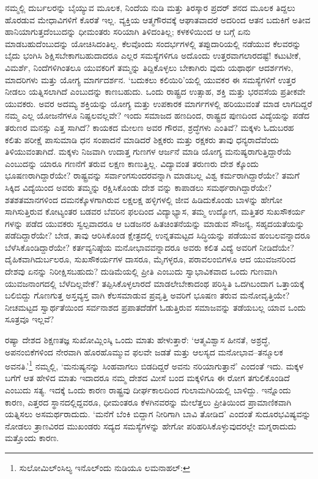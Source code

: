 ನಮ್ಮಲ್ಲಿ ದುರ್ಬಲರನ್ನು ಬೈಯ್ಯುವ ಮೂಲಕ, ನಿಂದೆಯ ನುಡಿ ಮತ್ತು ತಿರಸ್ಕಾರ ಪ್ರದರ್ ಶನದ ಮೂಲಕ ತಿದ್ದಲು ಹೊರಡುವ ಮೇಧಾವಿಗಳಿಗೆ ಕೊರತೆ ಇಲ್ಲ. ವ್ಯಕ್ತಿಯ ಆತ್ಮಗೌರವಕ್ಕೆ ಆಘಾತವಾದರೆ ಅದರಿಂದ ಆತನ ಬದುಕಿಗೆ ಅತೀವ ಹಾನಿಯಾಗುತ್ತದೆಂಬುದನ್ನು ಧೀಮಂತರು ಸರಿಯಾಗಿ ತಿಳಿದಂತಿಲ್ಲ; ಕಳಕಳಿಯಿಂದ ಆ ಬಗ್ಗೆ ಏನು ಮಾಡಬಹುದೆಂಬುದನ್ನು ಯೋಚಿಸಿದಂತಿಲ್ಲ. ಕೆಲವೊಂದು ಸಂದರ್ಭಗಳಲ್ಲಿ ತಪ್ಪುದಾರಿಯಲ್ಲಿ ನಡೆಯುವ ಕೆಲವರನ್ನು ಬೈದು ಭಂಗಿಸಿ ಶಿಕ್ಷಿಸಬೇಕಾಗಬಹುದಾದರೂ ಎಲ್ಲರ ಸಮಸ್ಯೆಗಳಿಗೂ ಅದೊಂದು ಉತ್ತರವಾಗಲಾರದಷ್ಟೆ! ಕಟುಟೀಕೆ, ವಿಮರ್ಶೆ, ನಿಂದೆಗಳಿಗಿಂತಲೂ ಯುವಕರಿಗೆ ತಮ್ಮನ್ನು ತಿದ್ದಿಕೊಳ್ಳಲು ಬೇಕಾಗಿರು ವುದು ಯಥಾರ್ಥ ಆದರ್ಶಗಳು, ಮಾದರಿಗಳು ಮತ್ತು ಯೋಗ್ಯ ಮಾರ್ಗದರ್ಶನ. ‘ಬದುಕಲು ಕಲಿಯಿರಿ’ಯಲ್ಲಿ ಯುವಕರ ಈ ಸಮಸ್ಯೆಗಳಿಗೆ ಉತ್ತರ ನೀಡಲು ಯತ್ನಿಸಲಾಗಿದೆ ಎಂಬುದನ್ನು ಕಾಣಬಹುದು. ಒಂದು ರಾಷ್ಟ್ರದ ಉತ್ಸಾಹ, ಶಕ್ತಿ ಮತ್ತು ಭರವಸೆಯ ಪ್ರತೀಕವೇ ಯುವಕರು. ಅವರ ಅದಮ್ಯ ಶಕ್ತಿಯನ್ನು ಯೋಗ್ಯ ಮತ್ತು ಉಪಕಾರಕ ಮಾರ್ಗಗಳಲ್ಲಿ ಹರಿಯುವಂತೆ ಮಾಡ ಲಾಗದಿದ್ದರೆ ನಮ್ಮ ಎಲ್ಲ ಯೋಜನೆಗಳೂ ನಿಷ್ಫಲವಲ್ಲವೇ? ಇಂದು ಸಮಾಜದ ಹಣದಿಂದ, ರಾಷ್ಟ್ರದ ಪುಣದಿಂದ ವಿದ್ಯೆಯನ್ನು ಪಡೆದ ತರುಣರ ಮನಸ್ಸು ಎತ್ತ ಸಾಗಿದೆ? ಕಾಯಕದ ಮೇಲಣ ಅವರ ಗೌರವ, ಶ್ರದ್ಧೆಗಳು ಎಂತಿವೆ? ಮಕ್ಕಳು ಓದುಬರಹ ಕಲಿತು ಪರೀಕ್ಷೆ ಪಾಸುಮಾಡಿ ಧನ ಸಂಪಾದನೆ ಮಾಡಿದರೆ ಶಿಕ್ಷಕರು ಮತ್ತು ರಕ್ಷಕರು ತಾವು ಧನ್ಯರಾದೆವೆಂದು ತಿಳಿಯುವಂತಾಗಿದೆ. ಮಕ್ಕಳು ನಿಜವಾಗಿ ಉದಾತ್ತ ಗುಣಗಳ ಆರ್ಜನೆ ಮಾಡಿ ಯೋಗ್ಯ ಮನುಷ್ಯರಾಗುತ್ತಿದ್ದಾರೆಯೆ ಎಂಬುದನ್ನು ಯಾರೂ ಗಣನೆಗೆ ತರುವ ಲಕ್ಷಣ ಕಾಣುತ್ತಿಲ್ಲ. ವಿದ್ಯಾವಂತ ತರುಣರು ದೇಶ ಕ್ಕೊಂದು ಭೂಷಣರಾಗಿದ್ದಾರೆಯೇ? ರಾಷ್ಟ್ರವನ್ನು ಸರ್ವಾಂಗಸುಂದರವನ್ನಾಗಿ ಮಾಡಬಲ್ಲ ವಿಶ್ವ ಕರ್ಮರಾಗಿದ್ದಾರೆಯೇ? ತಮಗೆ ಸಿಕ್ಕಿದ ವಿದ್ಯೆಯಿಂದ ಅವರು ತಮ್ಮನ್ನು ರಕ್ಷಿಸಿಕೊಂಡು ದೇಶ ವನ್ನು ಕಾಪಾಡಲು ಸಮರ್ಥರಾಗಿದ್ದಾರೆಯೇ? ಶತಶತಮಾನಗಳಿಂದ ದಮನಕ್ಕೊಳಗಾಗಿರುವ ಲಕ್ಷಲಕ್ಷ ಹಳ್ಳಿಗಳಲ್ಲಿ ಜೀವ ಹಿಡಿದುಕೊಂಡು ಬಾಳನ್ನು ಹೇಗೋ ಸಾಗಿಸುತ್ತಿರುವ ಕೋಟ್ಯಂತರ ಬಡವರ ಬೆವರಿನ ಫಲದಿಂದ ವಿದ್ಯಾಭ್ಯಾಸ, ತಮ್ಮ ಉದ್ಯೋಗ, ಮತ್ತಿತರ ಸುಖಸೌಕರ್ಯ ಗಳನ್ನು ಪಡೆದ ಯುವಕರು ಸ್ವಲ್ಪವಾದರೂ ಆ ಬಡಜನರ ಹಿತಚಿಂತನೆಯನ್ನು ಮಾಡುವ ಸೌಜನ್ಯ, ಸಹೃದಯತೆಯನ್ನು ಪಡೆದಿದ್ದಾರೆಯೇ? ಬೇಡ, ತಾವು ಆರಿಸಿಕೊಂಡ ಕ್ಷೇತ್ರದಲ್ಲಿ ಉನ್ನತಮಟ್ಟದ ಸಿದ್ಧಿಯನ್ನು ಪಡೆಯುವ ಹಂಬಲವನ್ನಾದರೂ ಬೆಳೆಸಿಕೊಂಡಿದ್ದಾರೆಯೇ? ಕರ್ತವ್ಯನಿಷ್ಠೆಯ ಮನೋಭಾವವನ್ನಾದರೂ ಅವರು ಕಲಿತ ವಿದ್ಯೆ ಅವರಿಗೆ ನೀಡಿದೆಯೇ? ದೈಹಿಕವಾಗಿ\break ದುರ್ಬಲರೂ, ಸುಖಸೌಕರ್ಯಗಳ ದಾಸರೂ, ಮೈಗಳ್ಳರೂ, ಪರಾವಲಂಬಿಗಳೂ ಆದ ಯುವಜನರಿಂದ ದೇಶವು ಏನನ್ನು ನಿರೀಕ್ಷಿಸಬಹುದು? ದುಡಿಮೆಯಲ್ಲಿ ಪ್ರೀತಿ ಎಂಬುದು ಸ್ವಾಭಾವಿಕವಾದ ಒಂದು ಗುಣವಾಗಿ ಯುವಜನಾಂಗದಲ್ಲಿ ಬೆಳೆದಿಲ್ಲವೇಕೆ? ತಪ್ಪಿಸಿಕೊಳ್ಳಲಾರದೆ ಮಾಡಲೇಬೇಕಾ\-ದಂಥ ಪರಿಸ್ಥಿತಿ ಒದಗಿಬಂದಾಗ ಒತ್ತಾಯಕ್ಕೆ ಬಲಿಬಿದ್ದು ಗೊಣಗುತ್ತ ಅಸ್ತವ್ಯಸ್ತ ವಾಗಿ ಕೆಲಸಮಾಡುವ ಪ್ರವೃತ್ತಿ ಅವರಿಗೆ ಭೂಷಣ ತರುವ ಮನೋವೃತ್ತಿಯೇ? ನೀಚಮಟ್ಟದ ಸ್ವಾರ್ಥತೆಯಿಂದ ಸರ್ವನಾಶದ ಪ್ರಪಾತದೆಡೆಗೆ ಓಡುತ್ತಿರುವ ಸಮಾಜವನ್ನು ತಡೆಯಬಲ್ಲ ಯಾವ ಒಂದು ಸೂತ್ರವೂ ಇಲ್ಲವೆ?

ರಷ್ಯಾ ದೇಶದ ಶಿಕ್ಷಣತಜ್ಞ ಸುಖೋಮ್ಲಿಂಸ್ಕಿ ಒಂದು ಮಾತು ಹೇಳುತ್ತಾರೆ: ‘ಆತ್ಮವಿಶ್ವಾಸ ಹೀನತೆ, ಅಶ್ರದ್ಧೆ, ಅಪನಂಬಿಕೆಗಳಿಂದ ನೇರವಾಗಿ ಹೊರಹೊಮ್ಮುವ ಫಲವೇ ಜಡತೆ ಮತ್ತು ಆಲಸ್ಯದ ಮನೋಭಾವ–ತನ್ಮೂಲಕ ಅವನತಿ.’\footnote{ ಸುಲೋಮಿಲ್ಂಸಿಲ್ಯ ಇನೊಲ್ಂದು ನುಡಿಯೂ ಲಮನಾಹಲ್:

} ನಮ್ಮಲ್ಲಿ, ‘ಮನುಷ್ಯನನ್ನು ಸಿಂಹವಾಗಲು ಬಿಡದಿದ್ದರೆ ಅವನು ನರಿಯಾಗುತ್ತಾನೆ’ ಎಂದಂತೆ ಇದು. ಮಕ್ಕಳ ಬಗೆಗೆ ಆತ ಹೇಳಿದ ಮಾತು ಇದಾದರೂ ನಮ್ಮ ದೇಶದ ಮೀಸೆ ಬಂದ ಮಕ್ಕಳಿಗೂ ಈ ರೋಗ ತಗುಲಿಕೊಂಡಿದೆ ಎಂಬುದು ಸತ್ಯ. ಇದಕ್ಕೆ ಒಂದು ಕಾರಣ ರಾಷ್ಟ್ರವು ದೀರ್ಘಕಾಲದಿಂದ ಗುಲಾಮಗಿರಿಯಲ್ಲಿ ಬಾಳಿದ್ದು. ಇನ್ನೊಂದು ಕಾರಣ, ಎತ್ತರದ ಸ್ಥಾನದಲ್ಲಿದ್ದವರೂ, ಧೀಮಂತರೂ ಕೆಳಗಿನವರನ್ನು ಮೇಲೆತ್ತಲು ಪ್ರೀತಿಯಿಂದ ಪ್ರಾಮಾಣಿಕವಾಗಿ ಯತ್ನಿಸಲು ಅಸಮರ್ಥರಾದುದು. ‘ಮನೆಗೆ ಬೆಂಕಿ ಬಿದ್ದಾಗ ನೀರಿಗಾಗಿ ಬಾವಿ ತೋಡಿದ’ ಎಂದಂತೆ ಸುದೂರಭವಿಷ್ಯವನ್ನು ನೋಡಲು ತ್ರಾಣವಿರದ ಮುಖಂಡರು ಸದ್ಯದ ಸಮಸ್ಯೆಗಳನ್ನು ಹೇಗೋ ಪರಿಹರಿಸಿಕೊಳ್ಳುವುದರಲ್ಲೇ ಮಗ್ನರಾದುದು ಮತ್ತೊಂದು ಕಾರಣ.

